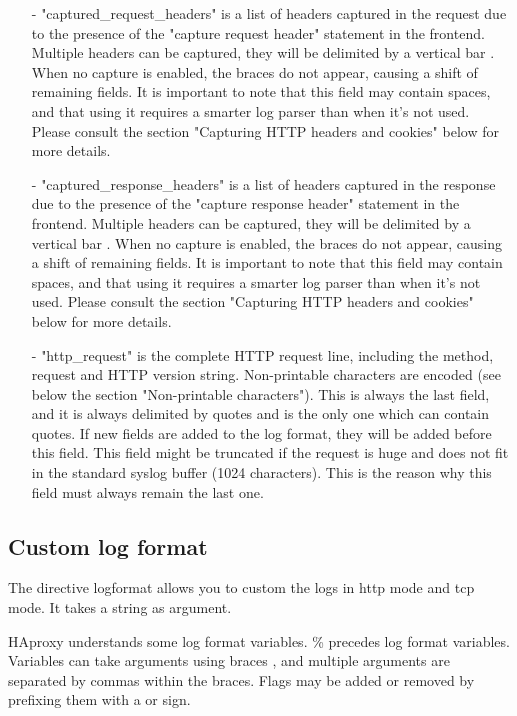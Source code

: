 \begin{itemize}
\item[-]
    "captured\_request\_headers" is a list of headers captured in the request due
    to the presence of the "capture request header" statement in the frontend.
    Multiple headers can be captured, they will be delimited by a vertical bar
    \chr{|}. When no capture is enabled, the braces do not appear, causing a
    shift of remaining fields. It is important to note that this field may
    contain spaces, and that using it requires a smarter log parser than when
    it's not used. Please consult the section "Capturing HTTP headers and
    cookies" below for more details.

\item[-]
    "captured\_response\_headers" is a list of headers captured in the response
    due to the presence of the "capture response header" statement in the
    frontend. Multiple headers can be captured, they will be delimited by a
    vertical bar \chr{|}. When no capture is enabled, the braces do not appear,
    causing a shift of remaining fields. It is important to note that this
    field may contain spaces, and that using it requires a smarter log parser
    than when it's not used. Please consult the section "Capturing HTTP headers
    and cookies" below for more details.

\item[-]
    "http\_request" is the complete HTTP request line, including the method,
    request and HTTP version string. Non-printable characters are encoded (see
    below the section "Non-printable characters"). This is always the last
    field, and it is always delimited by quotes and is the only one which can
    contain quotes. If new fields are added to the log format, they will be
    added before this field. This field might be truncated if the request is
    huge and does not fit in the standard syslog buffer (1024 characters). This
    is the reason why this field must always remain the last one.
\end{itemize}

\subsection{Custom log format}
\label{subsec:custom_log_format}

The directive log\-format allows you to custom the logs in http mode and tcp
mode. It takes a string as argument.

HAproxy understands some log format variables. \% precedes log format variables.
Variables can take arguments using braces \chr{\{\}}, and multiple arguments are
separated by commas within the braces. Flags may be added or removed by
prefixing them with a \chr{+} or \chr{-} sign.

